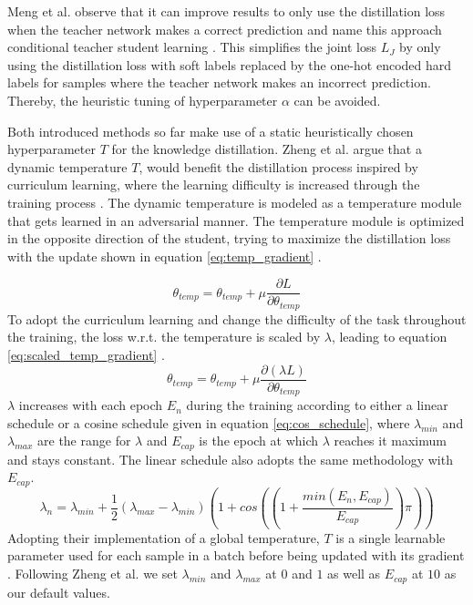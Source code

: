 \documentclass{article}
\begin{document}
Meng et al. observe that it can improve results to only use the distillation loss when the teacher network makes a correct prediction and name this approach conditional teacher student learning \cite{meng2019conditional}. This simplifies the joint loss $ L_J $ by only using the distillation loss with soft labels replaced by the one-hot encoded hard labels for samples where the teacher network makes an incorrect prediction. Thereby, the heuristic tuning of hyperparameter $ \alpha $ can be avoided.

Both introduced methods so far make use of a static heuristically chosen hyperparameter $ T $ for the knowledge distillation. Zheng et al. argue that a dynamic temperature $ T $, would benefit the distillation process inspired by curriculum learning, where the learning difficulty is increased through the training process \cite{liCurriculumTemperatureKnowledge2022}. The dynamic temperature is modeled as a temperature module that gets learned in an adversarial manner. The temperature module is optimized in the opposite direction of the student, trying to maximize the distillation loss with the update shown in equation \ref{eq:temp_gradient} \cite{liCurriculumTemperatureKnowledge2022}.

\begin{equation}
\label{eq:temp_gradient}
\theta_{temp} = \theta_{temp} + \mu \frac{\partial L}{\partial \theta_{temp}}
\end{equation}
To adopt the curriculum learning and change the difficulty of the task throughout the training, the loss w.r.t. the temperature is scaled by $ \lambda $, leading to equation \ref{eq:scaled_temp_gradient} \cite{liCurriculumTemperatureKnowledge2022}.
\begin{equation}
\label{eq:scaled_temp_gradient}
\theta_{temp} = \theta_{temp} + \mu \frac{\partial(\lambda L)}{\partial \theta_{temp}}
\end{equation}
$ \lambda $ increases with each epoch $ E_n $ during the training according to either a linear schedule or a cosine schedule given in equation \ref{eq:cos_schedule}, where $  \lambda_{min} $ and $  \lambda_{max} $ are the range for $ \lambda $ and $ E_{cap} $ is the epoch at which $ \lambda $ reaches it maximum and stays constant. The linear schedule also adopts the same methodology with $ E_{cap} $.
\begin{equation}
\label{eq:cos_schedule}
\lambda_{n} = \lambda_{min} + \frac{1}{2}(\lambda_{max}-\lambda_{min})(1 + cos((1+\frac{min(E_n, E_{cap})}{E_{cap}})\pi))
\end{equation}
Adopting their implementation of a global temperature, $ T $ is a single learnable parameter used for each sample in a batch before being updated with its gradient \cite{liCurriculumTemperatureKnowledge2022}. Following Zheng et al. we set $  \lambda_{min} $ and $  \lambda_{max} $ at $ 0 $ and $ 1 $ as well as $ E_{cap} $ at $ 10 $ as our default values.
\end{document}
